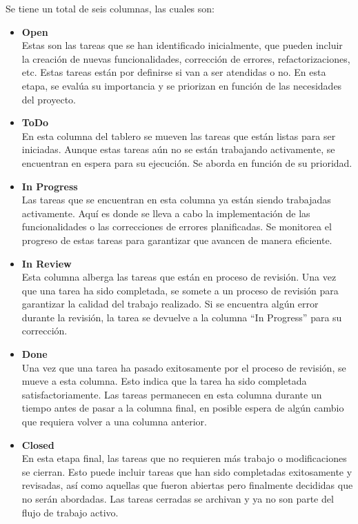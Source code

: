 Se tiene un total de seis columnas, las cuales son:
\begin{itemize}
  \item \textbf{Open} \\
  Estas son las tareas que se han identificado inicialmente, que pueden incluir la creación de nuevas funcionalidades, corrección de errores, refactorizaciones, etc. Estas tareas están por definirse si van a ser atendidas o no. En esta etapa, se evalúa su importancia y se priorizan en función de las necesidades del proyecto.
  \item \textbf{ToDo} \\
  En esta columna del tablero se mueven las tareas que están listas para ser iniciadas. Aunque estas tareas aún no se están trabajando activamente, se encuentran en espera para su ejecución. Se aborda en función de su prioridad.
  \item \textbf{In Progress} \\
  Las tareas que se encuentran en esta columna ya están siendo trabajadas activamente. Aquí es donde se lleva a cabo la implementación de las funcionalidades o las correcciones de errores planificadas. Se monitorea el progreso de estas tareas para garantizar que avancen de manera eficiente.
  \item \textbf{In Review} \\
  Esta columna alberga las tareas que están en proceso de revisión. Una vez que una tarea ha sido completada, se somete a un proceso de revisión para garantizar la calidad del trabajo realizado. Si se encuentra algún error durante la revisión, la tarea se devuelve a la columna ``In Progress'' para su corrección.
  \item \textbf{Done} \\
  Una vez que una tarea ha pasado exitosamente por el proceso de revisión, se mueve a esta columna. Esto indica que la tarea ha sido completada satisfactoriamente. Las tareas permanecen en esta columna durante un tiempo antes de pasar a la columna final, en posible espera de algún cambio que requiera volver a una columna anterior.
  \item \textbf{Closed} \\
  En esta etapa final, las tareas que no requieren más trabajo o modificaciones se cierran. Esto puede incluir tareas que han sido completadas exitosamente y revisadas, así como aquellas que fueron abiertas pero finalmente decididas que no serán abordadas. Las tareas cerradas se archivan y ya no son parte del flujo de trabajo activo.
\end{itemize}

